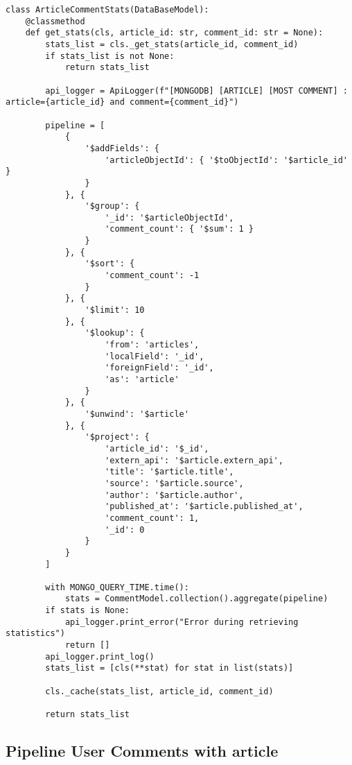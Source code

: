 \begin{lstlisting}[style=pythonstyle,label={lst:pipeline-article-stats-comment},caption={Pipeline Article Stats Comment}]
class ArticleCommentStats(DataBaseModel):
    @classmethod
    def get_stats(cls, article_id: str, comment_id: str = None):
        stats_list = cls._get_stats(article_id, comment_id)
        if stats_list is not None:
            return stats_list

        api_logger = ApiLogger(f"[MONGODB] [ARTICLE] [MOST COMMENT] : article={article_id} and comment={comment_id}")

        pipeline = [
            {
                '$addFields': {
                    'articleObjectId': { '$toObjectId': '$article_id' }
                }
            }, {
                '$group': {
                    '_id': '$articleObjectId',
                    'comment_count': { '$sum': 1 }
                }
            }, {
                '$sort': {
                    'comment_count': -1
                }
            }, {
                '$limit': 10
            }, {
                '$lookup': {
                    'from': 'articles',
                    'localField': '_id',
                    'foreignField': '_id',
                    'as': 'article'
                }
            }, {
                '$unwind': '$article'
            }, {
                '$project': {
                    'article_id': '$_id',
                    'extern_api': '$article.extern_api',
                    'title': '$article.title',
                    'source': '$article.source',
                    'author': '$article.author',
                    'published_at': '$article.published_at',
                    'comment_count': 1,
                    '_id': 0
                }
            }
        ]

        with MONGO_QUERY_TIME.time():
            stats = CommentModel.collection().aggregate(pipeline)
        if stats is None:
            api_logger.print_error("Error during retrieving statistics")
            return []
        api_logger.print_log()
        stats_list = [cls(**stat) for stat in list(stats)]

        cls._cache(stats_list, article_id, comment_id)

        return stats_list
\end{lstlisting}


\subsection{Pipeline User Comments with article}\label{subsec:pipeline-user-comments-with-article}

